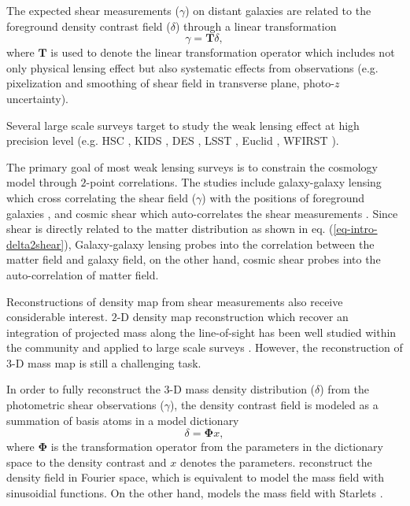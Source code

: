 \documentclass[twocolumn]{aastex62}
\begin{document}
The expected shear measurements ($\gamma$) on distant galaxies are related to the 
foreground density contrast field ($\delta$) through a linear transformation
\begin{equation} \label{eq-intro-delta2shear}
 \gamma=\mathbf{T} \delta,
\end{equation}
where $\mathbf{T}$ is used to denote the linear transformation operator which includes not only physical lensing effect
but also systematic effects from observations (e.g. pixelization and smoothing of shear field in
transverse plane, photo-$z$ uncertainty).

Several large scale surveys target to study the weak lensing effect at high precision level (e.g. HSC \citep{HSC1-data}, KIDS
\citep{KIDS13}, DES \citep{DES05}, LSST \citep{LSSTScienceBook}, Euclid \citep{Euclid2011}, WFIRST \citep{WFIRST15}).

The primary goal of most weak lensing surveys is to constrain the cosmology model through $2$-point correlations. The studies
include galaxy-galaxy lensing which cross correlating the shear field ($\gamma$) with the positions of foreground galaxies
\citep{gglens-GAMA-Han2014,gglens-BossCFHTMore2015,gglens-DES1},
and cosmic shear which auto-correlates the shear measurements
\citep{cosmicShearRealKids450,cosmicShear-DES1,cosmicShear_HSC1_Chiaki2019,cosmicShear_HSC1_Hamana2019}.
Since shear is directly related to the matter distribution as shown in eq. (\ref{eq-intro-delta2shear}), Galaxy-galaxy lensing
probes into the correlation between the matter field and galaxy field, on the other hand, cosmic shear probes into the
auto-correlation of matter field.

Reconstructions of density map from shear measurements also receive considerable interest. $2$-D density map reconstruction 
which recover an integration of projected mass along the line-of-sight has been well studied within the community
\citep{massMap-KS1993,WL-massMap-Glimpse2D-Lanusse2016,sparseBaysianMassMap-Price2020}
and applied to large scale surveys \citep{HSC1-massMaps,massMapDES-Chang2018,DES-SV-massMap-sparsity}. However, the 
reconstruction of $3$-D mass map is still a challenging task.

In order to fully reconstruct the $3$-D mass density distribution ($\delta$) from the photometric shear observations ($\gamma$),
the density contrast field is modeled as a summation of basis atoms in a model dictionary
\begin{equation} \label{eq-intro-dict}
 \delta= \mathbf{\Phi} x,
\end{equation}
where $\mathbf{\Phi}$ is the transformation operator from the parameters in the dictionary space to the density contrast 
and $x$ denotes the parameters. \citet{LSS-massMap-Wiener-Simon2009} reconstruct the density field
in Fourier space, which is equivalent to model the mass field with sinusoidial functions. On the other hand,
\citet{LSS-massMap-Glimpse3D-Leonard2014} models the mass field with Starlets \citep{Starlet-Starck2015}.
\end{document}
